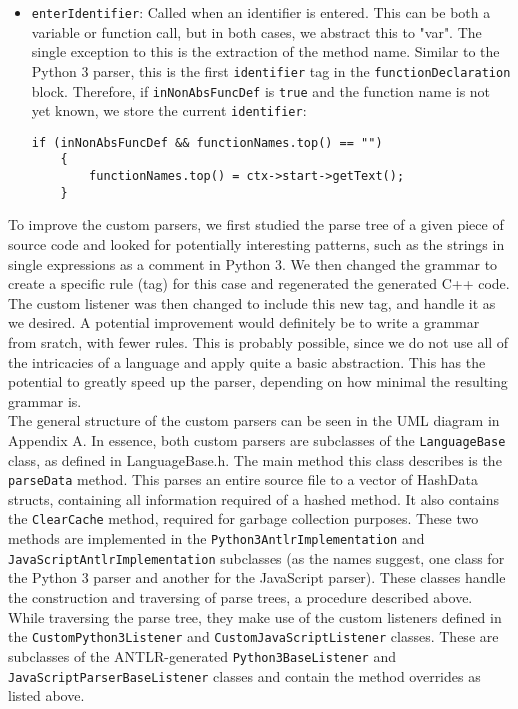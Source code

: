 \documentclass[../Main.tex]{subfiles}
\begin{document}
\begin{itemize}
\begin{lstlisting}
    \end{lstlisting}
    \item \texttt{enterIdentifier}: Called when an identifier is entered. This can be both a variable or function call, but in both cases, we abstract this to "var". The single exception to this is the extraction of the method name. Similar to the Python 3 parser, this is the first \texttt{identifier} tag in the \texttt{functionDeclaration} block. Therefore, if \texttt{inNonAbsFuncDef} is \texttt{true} and the function name is not yet known, we store the current \texttt{identifier}:
    \begin{lstlisting}
if (inNonAbsFuncDef && functionNames.top() == "")
	{
		functionNames.top() = ctx->start->getText();
	}
    \end{lstlisting}
\end{itemize}

To improve the custom parsers, we first studied the parse tree of a given piece of source code and looked for potentially interesting patterns, such as the strings in single expressions as a comment in Python 3. We then changed the grammar to create a specific rule (tag) for this case and regenerated the generated C++ code. The custom listener was then changed to include this new tag, and handle it as we desired. A potential improvement would definitely be to write a grammar from sratch, with fewer rules. This is probably possible, since we do not use all of the intricacies of a language and apply quite a basic abstraction. This has the potential to greatly speed up the parser, depending on how minimal the resulting grammar is.\\

The general structure of the custom parsers can be seen in the UML diagram in Appendix A. In essence, both custom parsers are subclasses of the \texttt{LanguageBase} class, as defined in LanguageBase.h. The main method this class describes is the \texttt{parseData} method. This parses an entire source file to a vector of HashData structs, containing all information required of a hashed method. It also contains the \texttt{ClearCache} method, required for garbage collection purposes. These two methods are implemented in the \texttt{Python3AntlrImplementation} and \texttt{JavaScriptAntlrImplementation} subclasses (as the names suggest, one class for the Python 3 parser and another for the JavaScript parser). These classes handle the construction and traversing of parse trees, a procedure described above. While traversing the parse tree, they make use of the custom listeners defined in the \texttt{CustomPython3Listener} and \texttt{CustomJavaScriptListener} classes. These are subclasses of the ANTLR-generated \texttt{Python3BaseListener} and \texttt{JavaScriptParserBaseListener} classes and contain the method overrides as listed above.
\end{document}
